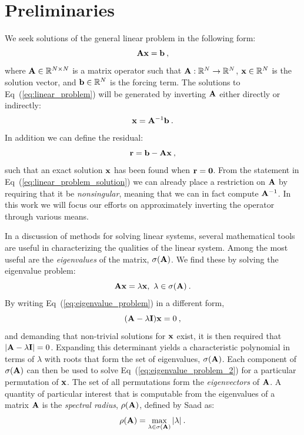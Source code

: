 \section{Preliminaries}
\label{sec:linear_preliminaries}
We seek solutions of the general linear problem in the following form:
\begin{equation}
  \mathbf{A} \mathbf{x} = \mathbf{b}\:,
  \label{eq:linear_problem}
\end{equation}
where $\mathbf{A} \in \mathbb{R}^{N \times N}$ is a matrix operator such
that $\mathbf{A} : \mathbb{R}^{N} \rightarrow \mathbb{R}^{N}$, $\mathbf{x} \in
\mathbb{R}^N$ is the solution vector, and $\mathbf{b} \in \mathbb{R}^N$ is
the forcing term. The solutions to Eq~(\ref{eq:linear_problem}) will
be generated by inverting $\mathbf{A}$ either directly or indirectly:
\begin{equation}
  \mathbf{x} = \mathbf{A}^{-1} \mathbf{b}
  \label{eq:linear_problem_solution}\:.
\end{equation}
In addition we can define the residual:
\begin{equation}
  \mathbf{r} = \mathbf{b} - \mathbf{A}\mathbf{x}\:,
  \label{eq:linear_residual}
\end{equation}
such that an exact solution $\mathbf{x}$ has been found when
$\mathbf{r}=\mathbf{0}$.  From the statement in
Eq~(\ref{eq:linear_problem_solution}) we can already place a
restriction on $\mathbf{A}$ by requiring that it be \textit{nonsingular},
meaning that we can in fact compute $\mathbf{A}^{-1}$. In this work we
will focus our efforts on approximately inverting the operator through
various means.

In a discussion of methods for solving linear systems, several
mathematical tools are useful in characterizing the qualities of the
linear system. Among the most useful are the \textit{eigenvalues} of
the matrix, $\sigma(\mathbf{A})$. We find these by solving the eigenvalue
problem:
\begin{equation}
  \mathbf{A} \mathbf{x} = \lambda \mathbf{x},\ \lambda \in \sigma(\mathbf{A})\:.
  \label{eq:eigenvalue_problem}
\end{equation}
By writing Eq~(\ref{eq:eigenvalue_problem}) in a different form,
\begin{equation}
  (\mathbf{A} - \lambda \mathbf{I})\mathbf{x} = 0 \:,
  \label{eq:eigenvalue_problem_2}
\end{equation}
and demanding that non-trivial solutions for $\mathbf{x}$ exist, it is
then required that $|\mathbf{A} - \lambda \mathbf{I}| = 0$. Expanding this
determinant yields a characteristic polynomial in terms of $\lambda$
with roots that form the set of eigenvalues, $\sigma(\mathbf{A})$. Each
component of $\sigma(\mathbf{A})$ can then be used to solve
Eq~(\ref{eq:eigenvalue_problem_2}) for a particular permutation of
$\mathbf{x}$. The set of all permutations form the \textit{eigenvectors}
of $\mathbf{A}$. A quantity of particular interest that is computable from
the eigenvalues of a matrix $\mathbf{A}$ is the \textit{spectral radius},
$\rho(\mathbf{A})$, defined by Saad \citep{saad_iterative_2003} as:
\begin{equation}
  \rho(\mathbf{A}) = \max_{\lambda \in \sigma(\mathbf{A})} |\lambda| \:.
  \label{eq:spectral_radius}
\end{equation}

